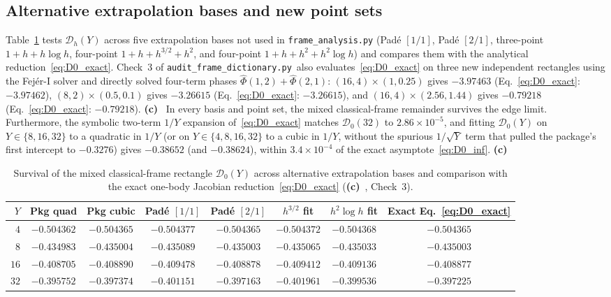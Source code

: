 \documentclass[11pt,a4paper]{article}
\newcommand{\Lc}{\textsf{\textbf{(c)}}\ }
\newcommand{\scr}{\texttt{audit\_\allowbreak frame\_\allowbreak dictionary.py}}
\begin{document}
\subsection{Alternative extrapolation bases and new point sets}
Table~\ref{tab:rect_audit} tests $\mathcal D_h(Y)$ across five extrapolation bases not
used in \texttt{frame\_\allowbreak analysis.py} (Pad\'e $[1/1]$, Pad\'e $[2/1]$,
three-point $1+h+h\log h$, four-point $1+h+h^{3/2}+h^2$, and four-point
$1+h+h^2+h^2\log h$) and compares them with the analytical reduction~\eqref{eq:D0_exact}.
Check~3 of \scr\ also evaluates~\eqref{eq:D0_exact} on three new independent rectangles
using the Fej\'er-I solver and directly solved four-term phases $\widehat\Phi(1,2)+\widehat\Phi(2,1)$:
$(16,4)\times(1,0.25)$ gives $-3.97463$ (Eq.~\eqref{eq:D0_exact}: $-3.97462$),
$(8,2)\times(0.5,0.1)$ gives $-3.26615$ (Eq.~\eqref{eq:D0_exact}: $-3.26615$), and
$(16,4)\times(2.56,1.44)$ gives $-0.79218$ (Eq.~\eqref{eq:D0_exact}: $-0.79218$). \Lc
In every basis and point set, the mixed classical-frame remainder survives the edge
limit. Furthermore, the symbolic two-term $1/Y$ expansion of~\eqref{eq:D0_exact}
matches $\mathcal D_0(32)$ to $2.86\times 10^{-5}$, and fitting $\mathcal D_0(Y)$ on
$Y\in\{8,16,32\}$ to a quadratic in $1/Y$ (or on $Y\in\{4,8,16,32\}$ to a cubic in $1/Y$,
without the spurious $1/\sqrt Y$ term that pulled the package's first intercept to
$-0.3276$) gives $-0.38652$ (and $-0.38624$), within $3.4\times 10^{-4}$ of the exact
asymptote~\eqref{eq:D0_inf}. \Lc

\begin{table}[ht]\centering\small
\setlength{\tabcolsep}{4pt}
\begin{tabular}{@{}rccccccc@{}}\toprule
$Y$ & Pkg quad & Pkg cubic & Pad\'e $[1/1]$ & Pad\'e $[2/1]$ & $h^{3/2}$ fit
 & $h^2\log h$ fit & Exact Eq.~\eqref{eq:D0_exact}\\\midrule
$4$  & $-0.504362$ & $-0.504365$ & $-0.504377$ & $-0.504365$ & $-0.504372$ & $-0.504368$ & $-0.504365$\\
$8$  & $-0.434983$ & $-0.435004$ & $-0.435089$ & $-0.435003$ & $-0.435065$ & $-0.435033$ & $-0.435003$\\
$16$ & $-0.408705$ & $-0.408890$ & $-0.409478$ & $-0.408878$ & $-0.409412$ & $-0.409136$ & $-0.408877$\\
$32$ & $-0.395752$ & $-0.397374$ & $-0.401151$ & $-0.397163$ & $-0.401961$ & $-0.399536$ & $-0.397225$\\\bottomrule
\end{tabular}
\caption{Survival of the mixed classical-frame rectangle $\mathcal D_0(Y)$ across
alternative extrapolation bases and comparison with the exact one-body Jacobian
reduction~\eqref{eq:D0_exact} (\Lc, Check~3).}\label{tab:rect_audit}
\end{table}
\end{document}
